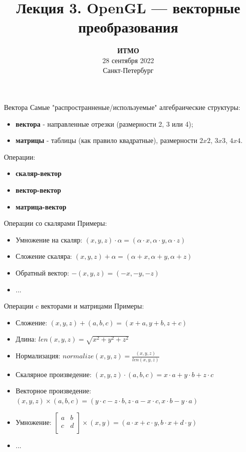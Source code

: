 \documentclass[aspectration=1610,t]{beamer}
\title{Лекция 3. OpenGL --- векторные преобразования}
\date{
   \textbf{ИТМО}\\
   28 сентября 2022\\
   Санкт-Петербург
}
\begin{document}
\begin{frame}
  \titlepage
\end{frame}

\begin{frame}[fragile]{Вектора}
    Самые "распространненые/используемые" алгебраические структуры:
    \begin{itemize}
        \item {\bf вектора} - направленные отрезки (размерности 2, 3 или 4);
        \item {\bf матрицы} - таблицы (как правило квадратные), размерности $2x2$, $3x3$, $4x4$.
    \end{itemize}
    Операции:
    \begin{itemize}
        \item {\bf скаляр-вектор}
        \item {\bf вектор-вектор}
        \item {\bf матрица-вектор}
    \end{itemize}
\end{frame}

\begin{frame}[fragile]{Операции со скалярами}
    Примеры:
    \begin{itemize}
        \item Умножение на скаляр: $(x, y, z) \cdot \alpha = (\alpha \cdot x, \alpha \cdot y, \alpha \cdot z)$
        \item Сложение скаляра: $(x, y, z) + \alpha = (\alpha + x, \alpha + y, \alpha + z)$
        \item Обратный вектор: $-(x, y, z) = (-x, -y, -z)$
        \item ...
    \end{itemize}
\end{frame}

\begin{frame}[fragile]{Операции c векторами и матрицами}
    Примеры:
    \begin{itemize}
        \item Сложение: $(x, y, z) + (a, b, c) = (x + a, y + b, z + c)$
        \item Длина: $len (x, y, z) = \sqrt{x^2 + y^2 + z^2}$
        \item Нормализация: $normalize (x, y, z) = \frac{(x, y, z)}{ len (x, y, z)}$
        \item Скалярное произведение: $(x, y, z) \cdot (a, b, c) = x \cdot a + y \cdot b + z \cdot c$
        \item Векторное произведение: $(x, y, z) \times (a, b, c) = (y \cdot c - z \cdot b, z \cdot a - x \cdot c, x \cdot b - y \cdot a)$
        \item Умножение: $\begin{bmatrix} a & b \\ c & d \\ \end{bmatrix} \times (x, y) = (a \cdot x + c \cdot y, b \cdot x + d \cdot y)$
        \item ...
    \end{itemize}
\end{frame}
\end{document}
